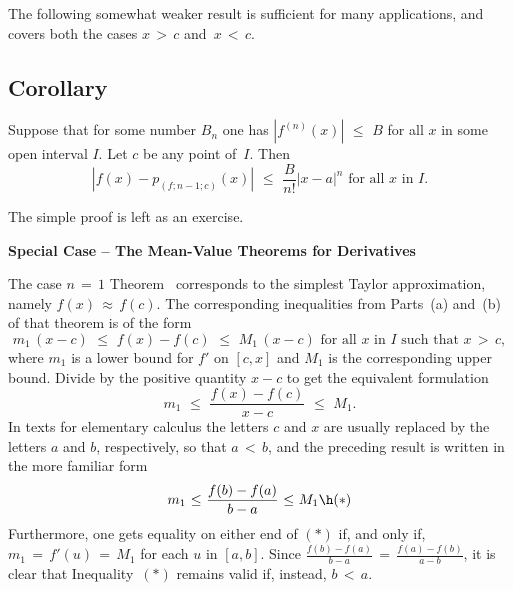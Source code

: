 


\VV

        The following somewhat weaker result is sufficient for many applications, and covers both the cases $x\,>\,c$ and~$x\,<\,c$.


\V

            \subsection{\small{\bf Corollary}}
            \label{CorE40.69B}

\V

        Suppose that for some number $B_{n}$ one has $|f^{(n)}(x)|\,\,{\leq}\,\,B$
    for all $x$ in some open interval $I$. Let $c$ be any point of~$I$. Then
        \begin{displaymath}
        |f(x)- p_{(f;n-1;c)}(x)|\,\,{\leq}\,\,\frac{B}{n!}|x-a|^{n} \mbox{ for all $x$ in~$I$}.
        \end{displaymath}

\V

        The simple proof is left as an exercise. \Q

\VV


        {\bf Special Case -- The Mean-Value Theorems for Derivatives}

\V

        The case $n \,=\, 1$ Theorem~
    corresponds to the simplest Taylor approximation, namely $f(x) \,{\approx}\, f(c)$.
    The corresponding inequalities from Parts~(a) and~(b) of that theorem is of the form
        \begin{displaymath}
        m_{1}\,(x-c)\,\,{\leq}\,\,f(x)-f(c)\,\,{\leq}\,\,M_{1}\,(x-c)
    \mbox{ for all $x$ in $I$ such that $x\,>\,c$},
        \end{displaymath}
    where $m_{1}$ is a lower bound for $f'$ on $[c,x]$ and $M_{1}$ is the corresponding upper bound.
    Divide by the positive quantity $x-c$ to get the equivalent formulation
        \begin{displaymath}
        m_{1}\,\,{\leq}\,\,\frac{f(x) - f(c)}{x-c}\,\,{\leq}\,\,M_{1}.
        \end{displaymath}
    In texts for elementary calculus the letters $c$ and $x$ are usually replaced by the letters $a$ and $b$, respectively,
    so that $a\,<\,b$, and the preceding result is written in the more familiar form
        \begin{displaymath}
        m_{1}\,\,{\leq}\,\,\frac{f(b) - f(a)}{b-a}\,\,{\leq}\,\,M_{1} \h ({\ast})
        \end{displaymath}
    Furthermore, one gets equality on either end of $({\ast})$ if, and only if, $m_{1} \,=\, f'(u) \,=\,M_{1}$ for each $u$ in $[a,b]$.
    Since ${\displaystyle \frac{f(b) - f(a)}{b-a} \,=\, \frac{f(a)-f(b)}{a-b}}$, it is clear that Inequality~$({\ast})$ remains valid if, instead, $b\,<\,a$.
    
